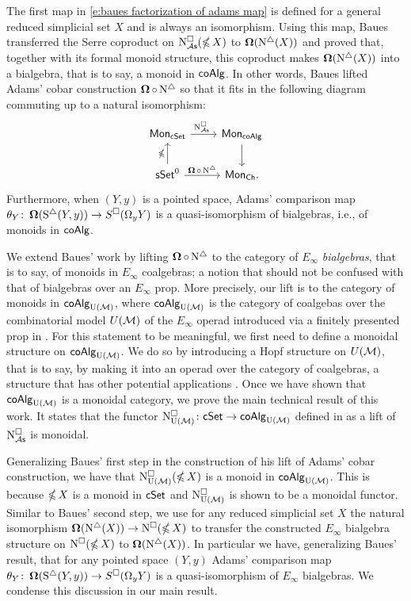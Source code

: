 The first map in \eqref{e:baues factorization of adams map} is defined for a general reduced simplicial set $X$ and is always an isomorphism.
Using this map, Baues transferred the Serre coproduct on $\operatorname{N^{\square}_{{\mathcal{A}\mathsf{s}}}}(\operatorname{\mathbb{\Omega}} X)$ to $\operatorname{\mathbf{\Omega}}(\operatorname{N^{\triangle}}(X))$ and proved that, together with its formal monoid structure, this coproduct makes $\operatorname{\mathbf{\Omega}}(\operatorname{N^{\triangle}}(X))$ into a bialgebra, that is to say, a monoid in $\mathsf{coAlg}$.
In other words, Baues lifted Adams' cobar construction $\operatorname{\mathbf{\Omega}} \circ \operatorname{N^{\triangle}}$ so that it fits in the following diagram commuting up to a natural isomorphism:
\begin{equation*}
\begin{tikzcd}
\Mon_{\cSet} \arrow[r, "\cchainsAS \ "] & \Mon_{\coAlg} \arrow[d] \\
\sSet^0 \arrow[r, "\cobar \circ \schains"] \arrow[u, "\ccobar"] & \Mon_{\Ch}.
\end{tikzcd}
\end{equation*}
Furthermore, when $(Y, y)$ is a pointed space, Adams' comparison map $\theta_Y \colon \operatorname{\mathbf{\Omega}}(\operatorname{S^{\triangle}}(Y, y)) \to S^{\square}(\Omega_y Y)$ is a quasi-isomorphism of bialgebras, i.e., of monoids in $\mathsf{coAlg}$.

We extend Baues' work by lifting $\operatorname{\mathbf{\Omega}} \circ \operatorname{N^{\triangle}}$ to the category of $E_\infty$ \textit{bialgebras}, that is to say, of monoids in $E_\infty$ coalgebras; a notion that should not be confused with that of bialgebras over an $E_\infty$ prop.
More precisely, our lift is to the category of monoids in $\mathsf{coAlg}_{\operatorname{U}(\mathcal{M})}$, where $\mathsf{coAlg}_{\operatorname{U}(\mathcal{M})}$ is the category of coalgebas over the combinatorial model $U(\mathcal{M})$ of the $E_\infty$ operad introduced via a finitely presented prop in \cite{medina2020prop1}.
For this statement to be meaningful, we first need to define a monoidal structure on $\mathsf{coAlg}_{\operatorname{U}(\mathcal{M})}$.
We do so by introducing a Hopf structure on $U(\mathcal{M})$, that is to say, by making it into an operad over the category of coalgebras, a structure that has other potential applications \cite{livernet2008hopf}.
Once we have shown that $\mathsf{coAlg}_{\operatorname{U}(\mathcal{M})}$ is a monoidal category, we prove the main technical result of this work.
It states that the functor $\operatorname{N^{\square}_{{\operatorname{U}(\mathcal{M})}}} \colon \mathsf{cSet} \to \mathsf{coAlg}_{\operatorname{U}(\mathcal{M})}$ defined in \cite{medina2021cubical} as a lift of $\operatorname{N^{\square}_{{\mathcal{A}\mathsf{s}}}}$ is monoidal.

Generalizing Baues' first step in the construction of his lift of Adams' cobar construction, we have that $\operatorname{N^{\square}_{{\operatorname{U}(\mathcal{M})}}}(\operatorname{\mathbb{\Omega}} X)$ is a monoid in $\mathsf{coAlg}_{\operatorname{U}(\mathcal{M})}$.
This is because $\operatorname{\mathbb{\Omega}} X$ is a monoid in $\mathsf{cSet}$ and $\operatorname{N^{\square}_{{\operatorname{U}(\mathcal{M})}}}$ is shown to be a monoidal functor.
Similar to Baues' second step, we use for any reduced simplicial set $X$ the natural isomorphism $\operatorname{\mathbf{\Omega}}(\operatorname{N^{\triangle}}(X)) \to \operatorname{N^{\square}}(\operatorname{\mathbb{\Omega}} X)$ to transfer the constructed $E_\infty$ bialgebra structure on $\operatorname{N^{\square}}(\operatorname{\mathbb{\Omega}} X)$ to $\operatorname{\mathbf{\Omega}}(\operatorname{N^{\triangle}}(X))$.
In particular we have, generalizing Baues' result, that for any pointed space $(Y, y)$ Adams' comparison map $\theta_Y \colon \operatorname{\mathbf{\Omega}}(\operatorname{S^{\triangle}}(Y, y)) \to S^{\square}(\Omega_y Y)$ is a quasi-isomorphism of $E_\infty$ bialgebras.
We condense this discussion in our main result.

